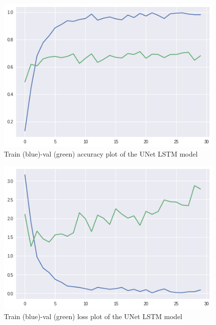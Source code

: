 \documentclass[conference]{IEEEtran}
\begin{document}
\begin{figure}[H]
\begin{center}
\includegraphics[scale=0.4]{UNet_LSTM/UNet_LSTM_acc_plot.png}
\end{center}
\caption{\label{fig:train_val_acc_UNet_LSTM} 
Train (blue)-val (green) accuracy plot of the UNet LSTM model}
\end{figure}
\begin{figure}[H]
\begin{center}
\includegraphics[scale=0.4]{UNet_LSTM/UNet_LSTM_loss_plot.png}
\end{center}
\caption{\label{fig:train_val_loss_UNet_LSTM} 
Train (blue)-val (green) loss plot of the UNet LSTM model}
\end{figure}
\end{document}
